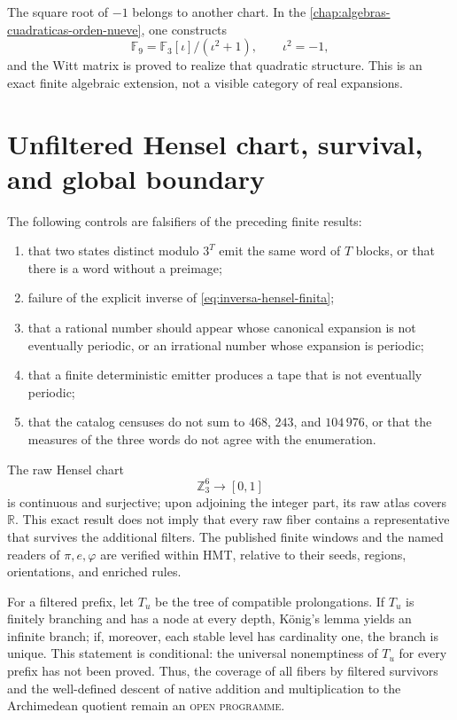 The square root of \(-1\) belongs to another chart. In the
\cref{chap:algebras-cuadraticas-orden-nueve}, one constructs
\[
\mathbb F_9=\mathbb F_3[\iota]/(\iota^2+1),
\qquad \iota^2=-1,
\]
and the Witt matrix is proved to realize that quadratic structure. This is
an exact finite algebraic extension, not a visible category of real
expansions.

\section{Unfiltered Hensel chart, survival, and global boundary}

The following controls are falsifiers of the preceding finite results:
\begin{enumerate}
\item that two states distinct modulo \(3^T\) emit the same word of
\(T\) blocks, or that there is a word without a preimage;
\item failure of the explicit inverse of
\cref{eq:inversa-hensel-finita};
\item that a rational number should appear whose canonical expansion is not eventually
periodic, or an irrational number whose expansion is periodic;
\item that a finite deterministic emitter produces a tape that is
not eventually periodic;
\item that the catalog censuses do not sum to \(468\),
\(243\), and \(104\,976\), or that the measures of the three words do
not agree with the enumeration.
\end{enumerate}

The raw Hensel chart
\[
\mathbb Z_3^6\longrightarrow[0,1]
\]
is continuous and surjective; upon adjoining the integer part, its raw atlas covers \(\mathbb R\). This exact result does not imply that every raw fiber contains a representative that survives the additional filters. The published finite windows and the named readers of \(\pi,e,\varphi\) are verified within HMT, relative to their seeds, regions, orientations, and enriched rules.

\ifdefined\HMTInternalTraceability
For a filtered prefix, let \(T_u\) be the tree of compatible prolongations.
If \(T_u\) is finitely branching and has a node at every depth,
König's lemma yields an infinite branch; if, moreover, each stable level has
cardinality one, the branch is unique. This statement is conditional: the
universal nonemptiness of \(T_u\) for every prefix has not been proved. Thus, the
coverage of all fibers by filtered survivors and the well-defined descent of
native addition and multiplication to the Archimedean quotient remain an
\textsc{open programme}.
\fi
